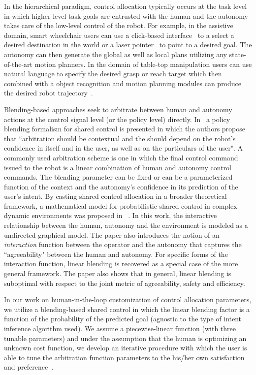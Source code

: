 \documentclass[12pt]{article}
\begin{document}
In the hierarchical paradigm, control allocation typically occurs at the task level in which higher level task goals are entrusted with the human and the autonomy takes care of the low-level control of the robot. For example, in the assistive domain, smart wheelchair users can use a click-based interface~\cite{simpson2008tooth} to a select a desired destination in the world or a laser pointer~\cite{choi2008laser} to point to a desired goal. The autonomy can then generate the global as well as local plans utilizing any state-of-the-art motion planners. In the domain of table-top manipulation users can use natural language to specify the desired grasp or reach target which then combined with a object recognition and motion planning modules can produce the desired robot trajectory~\cite{broad2016towards}. 

Blending-based approaches seek to arbitrate between human and autonomy actions at the control signal level (or the policy level) directly. In~\cite{dragan2013policy} a policy blending formalism for shared control is presented in which the authors propose that ``arbitration should be contextual and the should depend on the robot's confidence in itself and in the user, as well as on the particulars of the user". A commonly used arbitration scheme is one in which the final control command issued to the robot is a linear combination of human and autonomy control commands. The blending parameter can be fixed or can be a parameterized function of the context and the autonomy's confidence in its prediction of the user's intent.  By casting shared control allocation in a broader theoretical framework, a mathematical model for probabilistic shared control in complex dynamic environments was proposed in ~\cite{trautman2015assistive}. In this work, the interactive relationship between the human, autonomy and the environment is modeled as a undirected graphical model. The paper also introduces the notion of an \textit{interaction} function between the operator and the autonomy that captures the ``agreeability" between the human and autonomy. For specific forms of the interaction function, linear blending is recovered as a special case of the more general framework. The paper also shows that in general, linear blending is suboptimal with respect to the joint metric of agreeability, safety and efficiency. 

In our work on human-in-the-loop customization of control allocation parameters, we utilize a blending-based shared control in which the linear blending factor is a function of the probability of the predicted goal (agnostic to the type of intent inference algorithm used). We assume a piecewise-linear function (with three tunable parameters) and under the assumption that the human is optimizing an unknown cost function, we develop an iterative procedure with which the user is able to tune the arbitration function parameters to the his/her own satisfaction and preference~\cite{gopinath2017human}.
\end{document}
